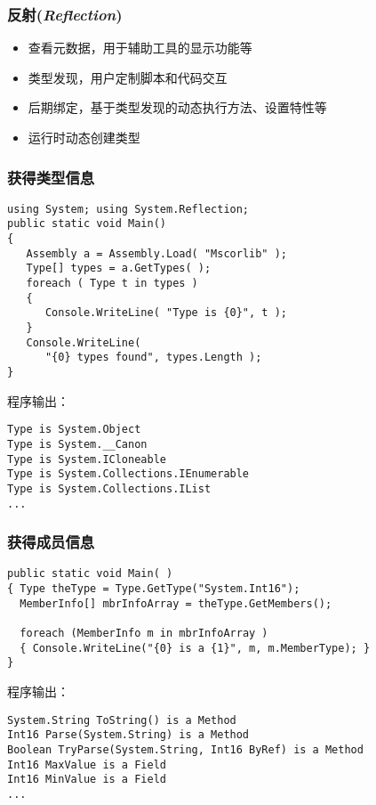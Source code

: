 \begin{frame}
\frametitle{反射(\textit{Reflection})}
\begin{itemize}
\setlength{\itemsep}{6pt plus 1pt}
\item 查看元数据，用于辅助工具的显示功能等
\item 类型发现，用户定制脚本和代码交互
\item 后期绑定，基于类型发现的动态执行方法、设置特性等
\item 运行时动态创建类型
\end{itemize}
\end{frame}

\begin{frame}[fragile]
\frametitle{获得类型信息}
\begin{lstlisting}
using System; using System.Reflection;
public static void Main()
{
   Assembly a = Assembly.Load( "Mscorlib" );
   Type[] types = a.GetTypes( );
   foreach ( Type t in types )
   {
      Console.WriteLine( "Type is {0}", t );
   }
   Console.WriteLine(
      "{0} types found", types.Length );
}
\end{lstlisting}
程序输出：\scriptsize
\begin{verbatim}
Type is System.Object
Type is System.__Canon
Type is System.ICloneable
Type is System.Collections.IEnumerable
Type is System.Collections.IList
...
\end{verbatim}
\end{frame}

\begin{frame}[fragile]
\frametitle{获得成员信息}
\begin{lstlisting}
public static void Main( )
{ Type theType = Type.GetType("System.Int16");
  MemberInfo[] mbrInfoArray = theType.GetMembers();

  foreach (MemberInfo m in mbrInfoArray )
  { Console.WriteLine("{0} is a {1}", m, m.MemberType); }
}
\end{lstlisting}
程序输出：\scriptsize
\begin{verbatim}
System.String ToString() is a Method
Int16 Parse(System.String) is a Method
Boolean TryParse(System.String, Int16 ByRef) is a Method
Int16 MaxValue is a Field
Int16 MinValue is a Field
...
\end{verbatim}
\end{frame}


